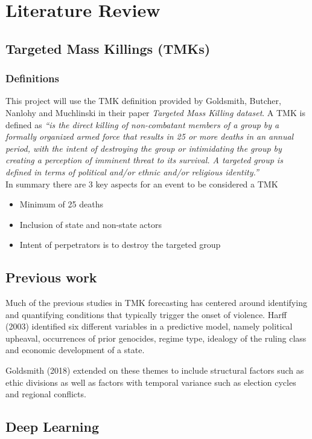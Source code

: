 \chapter{Literature Review}\label{ch:background}

\section{Targeted Mass Killings (TMKs)}
\subsection{Definitions}
This project will use the TMK definition provided by Goldsmith, Butcher, Nanlohy and Muchlinski in their paper \emph{Targeted Mass Killing dataset}. A TMK is defined as \emph{“is the direct killing of non-combatant members of a
group by a formally organized armed force that results in 25 or more deaths in an annual period,
with the intent of destroying the group or intimidating the group by creating a perception of
imminent threat to its survival. A targeted group is defined in terms of political and/or ethnic and/or
religious identity.”} \\
In summary there are 3 key aspects for an event to be considered a TMK
\begin{itemize}
  \item Minimum of 25 deaths
  \item Inclusion of state and non-state actors
  \item Intent of perpetrators is to destroy the targeted group
\end{itemize}

\section{Previous work}
Much of the previous studies in TMK forecasting has centered around identifying and quantifying conditions that typically trigger the onset of violence. Harff (2003) identified six different variables in a predictive model, namely political upheaval, occurrences of prior genocides, regime type, idealogy of the ruling class and economic development of a state. 

Goldsmith (2018) extended on these themes to include structural factors such as ethic divisions as well as factors with temporal variance such as election cycles and regional conflicts.



\section{Deep Learning}


